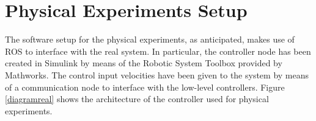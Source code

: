 \section{Physical Experiments Setup}
The software setup for the physical experiments, as anticipated, makes use of ROS to interface with the real system. In particular, the controller node has been created in Simulink by means of the Robotic System Toolbox provided by Mathworks. The control input velocities have been given to the system by means of a communication node to interface with the low-level controllers. Figure \ref{diagramreal} shows the architecture of the controller used for physical experiments.



